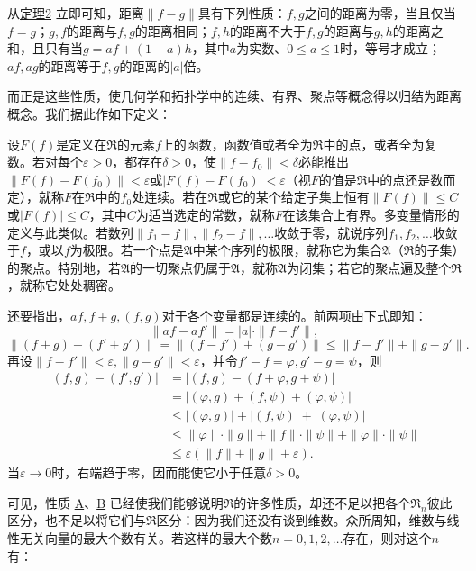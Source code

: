 \documentclass[fontsize=13pt,twoside,openany,headings=normal,parskip=false,bookmarkpackage=false,DIV=calc]{scrbook}
\begin{document}
从\CJKglue \hyperref[thm:II.2]{定理2} 立即可知，距离$\|f-g\|$具有下列性质：$f,\allowbreak g$之间的距离为零，当且仅当$f=g$；$g,\allowbreak f$的距离与$f,\allowbreak g$的距离相同；$f,\allowbreak h$的距离不大于$f,\allowbreak g$的距离与$g,\allowbreak h$的距离之和，且只有当$g=af+(1-a)h$，其中$a$为实数、$0\leq a\leq1$时，等号才成立；$af,\allowbreak ag$的距离等于$f,\allowbreak g$的距离的$|a|$倍。

\hypertarget{origpage-23}{}\label{origpage-23}而正是这些性质，使几何学和拓扑学中的连续、有界、聚点等概念得以归结为距离概念。我们据此作如下定义：

设$F(f)$是定义在$\mathfrak{R}$的元素$f$上的函数，函数值或者全为$\mathfrak{R}$中的点，或者全为复数。若对每个$\varepsilon>0$，都存在$\delta>0$，使$\|f-f_0\|<\delta$必能推出$\|F(f)-F(f_0)\|<\varepsilon$或$|F(f)-F(f_0)|<\varepsilon$（视$F$的值是$\mathfrak{R}$中的点还是数而定），就称$F$在$\mathfrak{R}$中的$f_0$处连续。若在$\mathfrak{R}$或它的某个给定子集上恒有$\|F(f)\|\leq C$或$|F(f)|\leq C$，其中$C$为适当选定的常数，就称$F$在该集合上有界。多变量情形的定义与此类似。若数列$\|f_1-f\|,\allowbreak \|f_2-f\|,\allowbreak \ldots$收敛于零，就说序列$f_1,\allowbreak f_2,\allowbreak \ldots$收敛于$f$，或以$f$为极限。若一个点是$\mathfrak{A}$中某个序列的极限，就称它为集合$\mathfrak{A}$（$\mathfrak{R}$的子集）的聚点。特别地，若$\mathfrak{A}$的一切聚点仍属于$\mathfrak{A}$，就称$\mathfrak{A}$为闭集；若它的聚点遍及整个$\mathfrak{R}$，就称它处处稠密。

还要指出，$af,\allowbreak f+g,\allowbreak (f,\allowbreak g)$对于各个变量都是连续的。前两项由下式即知：
\[
\|af-af'\|=|a|\cdot\|f-f'\|,
\]
\[
\|(f+g)-(f'+g')\|
=\|(f-f')+(g-g')\|\leq\|f-f'\|+\|g-g'\|.
\]
再设$\|f-f'\|<\varepsilon,\allowbreak \|g-g'\|<\varepsilon$，并令$f'-f=\varphi,\allowbreak g'-g=\psi$，则
\begin{align*}
|(f,g)-(f',g')|
&=|(f,g)-(f+\varphi,g+\psi)|\\
&=|(\varphi,g)+(f,\psi)+(\varphi,\psi)|\\
&\leq|(\varphi,g)|+|(f,\psi)|+|(\varphi,\psi)|\\
&\leq\|\varphi\|\cdot\|g\|+\|f\|\cdot\|\psi\|
+\|\varphi\|\cdot\|\psi\|\\
&\leq\varepsilon(\|f\|+\|g\|+\varepsilon).
\end{align*}
当$\varepsilon\to0$时，右端趋于零，因而能使它小于任意$\delta>0$。

可见，性质 \hyperref[ax:II.A]{A}、\hyperref[ax:II.B]{B} 已经使我们能够说明$\mathfrak{R}$的许多性质，却还不足以把各个$\mathfrak{R}_n$彼此区分，也不足以将它们与$\mathfrak{R}$区分：因为我们还没有谈到维数。众所周知，维数与线性无关向量的最大个数有关。若这样的最大个数$n=0,\allowbreak 1,\allowbreak 2,\allowbreak \ldots$存在，则对这个$n$有：
\end{document}
